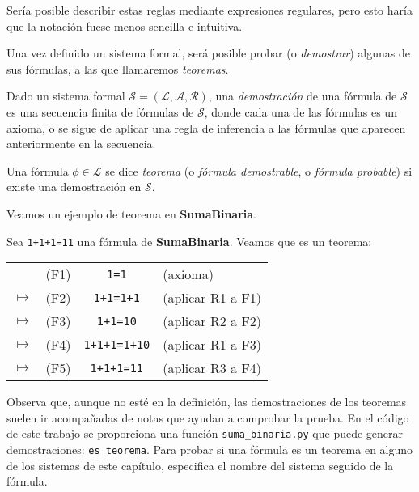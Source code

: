 Sería posible describir estas reglas mediante expresiones regulares, pero esto haría que la notación fuese menos sencilla e intuitiva.

Una vez definido un sistema formal, será posible probar (o \emph{demostrar}) algunas de sus fórmulas, a las que llamaremos \emph{teoremas}.

\begin{definicion}\label{def:teorema-demostracion}
Dado un sistema formal $\mathcal{S}=(\mathcal{L}, \mathcal{A}, \mathcal{R})$, una \emph{demostración} de una fórmula de $\mathcal{S}$ es una secuencia finita de fórmulas de $\mathcal{S}$, donde cada una de las fórmulas es un axioma, o se sigue de aplicar una regla de inferencia a las fórmulas que aparecen anteriormente en la secuencia.

Una fórmula $\phi\in \mathcal{L}$ se dice \emph{teorema} (o \emph{fórmula demostrable}, o \emph{fórmula probable}) si existe una demostración en $\mathcal{S}$.
\end{definicion}

Veamos un ejemplo de teorema en \textbf{SumaBinaria}.

\begin{ejemplo}\label{ej:teorema}
Sea \texttt{1+1+1=11} una fórmula de \textbf{SumaBinaria}. Veamos que es un teorema:

\begin{table}[h]
\centering
\begin{tabular}{lrcl}
& (F1) & \texttt{1=1} & (axioma) \\
$\mapsto$ & (F2) & \texttt{1+1=1+1} & (aplicar R1 a F1) \\
$\mapsto$ & (F3) & \texttt{1+1=10} & (aplicar R2 a F2) \\
$\mapsto$ & (F4) & \texttt{1+1+1=1+10} & (aplicar R1 a F3) \\
$\mapsto$ & (F5) & \texttt{1+1+1=11} & (aplicar R3 a F4) \\
\end{tabular}
\end{table}
\end{ejemplo}

Observa que, aunque no esté en la definición, las demostraciones de los teoremas suelen ir acompañadas de notas que ayudan a comprobar la prueba. En el código de este trabajo se proporciona una función \texttt{suma\_binaria.py} que puede generar demostraciones: \texttt{es\_teorema}. Para probar si una fórmula es un teorema en alguno de los sistemas de este capítulo, especifica el nombre del sistema seguido de la fórmula.

